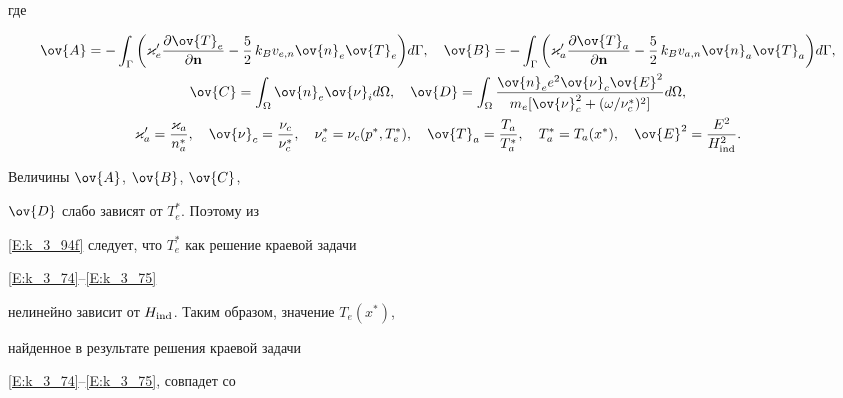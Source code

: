 где


\begin{gather}


\ov{A}=- \int_\Gamma


\bigg({\varkappa}'_e \frac{{\partial \ov{T}_e}} {{\partial \bold{n}}} -


\frac{5} {2}\,k_B v_{e,n} \ov{n}_e \ov{T}_e\bigg)


d\Gamma, \quad\ov{B}=- \int_\Gamma


\bigg({\varkappa}'_a \frac{{\partial \ov{T}_a}} {{\partial \bold{n}}} -


\frac{5} {2}\,k_B v_{a,n} \ov{n}_a \ov{T}_a\bigg)


d\Gamma, \label{E:k_3_100} \\


%


\ov{C}=\int_\Omega\ov{n}_e \ov{\nu}_i d\Omega, \quad


\ov{D}=\int_\Omega


\frac{\ov{n}_{e}e^{2}\ov{\nu}_{c}\ov{E}^2}{m_{e}


[\ov{\nu}_{c}^2+(\omega /\nu^\ast _c)^{2}]}d\Omega,\notag \\


%


{\varkappa}'_a=\frac{{\varkappa}_a}{n_a^\ast}, \quad


\ov{\nu}_c=\frac{{\nu}_c}{\nu_c^\ast},


\quad \nu_c ^\ast=\nu_c(p^\ast, T_e^\ast),\quad


\ov{T}_a=\frac{{T}_a}{T_a^\ast}, \quad


T_a^\ast=T_a ( x^\ast), \quad


\ov{E}^2=\frac{{E}^2}{H_{\ind}^2}. \label{E:k_3_101}


\end{gather}





Величины $\ov{A}$, $\ov{B}$, $\ov{C}$,


$\ov{D}$ слабо зависят от $T_e^\ast$. Поэтому из


\eqref{E:k_3_94f} следует, что $T_e^\ast$ как решение краевой задачи 


\eqref{E:k_3_74}--\eqref{E:k_3_75}


нелинейно зависит от $H_{\operatorname{ind}}$. Таким образом, значение $T_e(x^\ast)$,


найденное в результате решения краевой задачи


\eqref{E:k_3_74}--\eqref{E:k_3_75}, совпадет со


